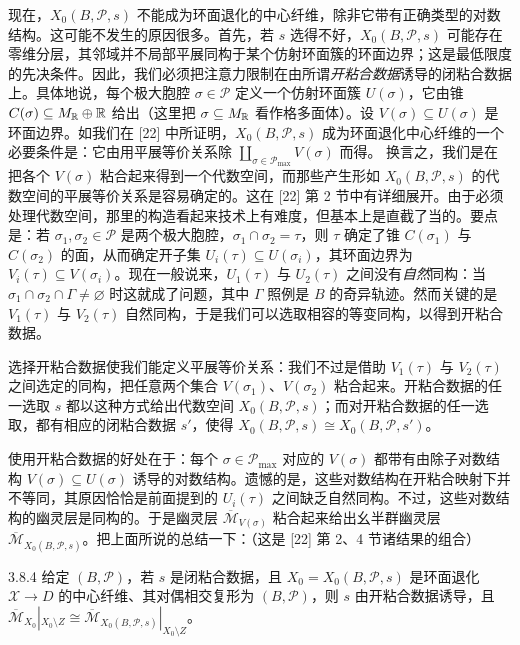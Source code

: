 现在，$X_0(B,\mathcal P,s)$ 不能成为环面退化的中心纤维，除非它带有正确类型的对数结构。这可能不发生的原因很多。首先，若 $s$ 选得不好，$X_0(B,\mathcal P,s)$ 可能存在零维分层，其邻域并不局部平展同构于某个仿射环面簇的环面边界；这是最低限度的先决条件。因此，我们必须把注意力限制在由所谓\emph{开粘合数据}诱导的闭粘合数据上。具体地说，每个极大胞腔 $\sigma\in\mathcal P$ 定义一个仿射环面簇 $U(\sigma)$，它由锥 $C(\sigma)\subseteq M_{\mathbb{R}}\oplus\mathbb{R}$ 给出（这里把 $\sigma\subseteq M_{\mathbb{R}}$ 看作格多面体）。设 $V(\sigma)\subseteq U(\sigma)$ 是环面边界。如我们在 [22] 中所证明，$X_0(B,\mathcal P,s)$ 成为环面退化中心纤维的一个必要条件是：它由用平展等价关系除 $\coprod_{\sigma\in\mathcal P_{\max}}V(\sigma)$ 而得。
换言之，我们是在把各个 $V(\sigma)$ 粘合起来得到一个代数空间，而那些产生形如 $X_0(B,\mathcal P,s)$ 的代数空间的平展等价关系是容易确定的。这在 [22] 第 2 节中有详细展开。由于必须处理代数空间，那里的构造看起来技术上有难度，但基本上是直截了当的。要点是：若 $\sigma_1,\sigma_2\in\mathcal P$ 是两个极大胞腔，$\sigma_1\cap\sigma_2=\tau$，则 $\tau$ 确定了锥 $C(\sigma_1)$ 与 $C(\sigma_2)$ 的面，从而确定开子集 $U_i(\tau)\subseteq U(\sigma_i)$，其环面边界为 $V_i(\tau)\subseteq V(\sigma_i)$。现在一般说来，$U_1(\tau)$ 与
$U_2(\tau)$ 之间没有\emph{自然}同构：当 $\sigma_1\cap\sigma_2\cap\Gamma\ne\varnothing$ 时这就成了问题，其中 $\Gamma$ 照例是 $B$ 的奇异轨迹。然而关键的是 $V_1(\tau)$ 与 $V_2(\tau)$ 自然同构，于是我们可以选取相容的等变同构，以得到开粘合数据。

选择开粘合数据使我们能定义平展等价关系：我们不过是借助 $V_1(\tau)$ 与 $V_2(\tau)$ 之间选定的同构，把任意两个集合 $V(\sigma_1)$、$V(\sigma_2)$ 粘合起来。开粘合数据的任一选取 $s$ 都以这种方式给出代数空间 $X_0(B,\mathcal P,s)$；而对开粘合数据的任一选取，都有相应的闭粘合数据 $s'$，使得 $X_0(B,\mathcal P,s)\cong X_0(B,\mathcal P,s')$。

使用开粘合数据的好处在于：每个 $\sigma\in\mathcal P_{\max}$ 对应的 $V(\sigma)$ 都带有由除子对数结构 $V(\sigma)\subseteq U(\sigma)$ 诱导的对数结构。遗憾的是，这些对数结构在开粘合映射下并不等同，其原因恰恰是前面提到的 $U_i(\tau)$ 之间缺乏自然同构。不过，这些对数结构的幽灵层是同构的。于是幽灵层 $\overline{\mathcal M}_{V(\sigma)}$ 粘合起来给出幺半群幽灵层 $\overline{\mathcal M}_{X_0(B,\mathcal P,s)}$。把上面所说的总结一下：（这是 [22] 第 2、4 节诸结果的组合）

\begin{theorem}{3.8.4}
给定 $(B,\mathcal P)$，若 $s$ 是闭粘合数据，且 $X_0=X_0(B,\mathcal P,s)$ 是环面退化 $\mathcal X\to D$ 的中心纤维、其对偶相交复形为 $(B,\mathcal P)$，则 $s$ 由开粘合数据诱导，且 $\overline{\mathcal M}_{X_0}|_{X_0\setminus Z}\cong\overline{\mathcal M}_{X_0(B,\mathcal P,s)}|_{X_0\setminus Z}$。
\end{theorem}

